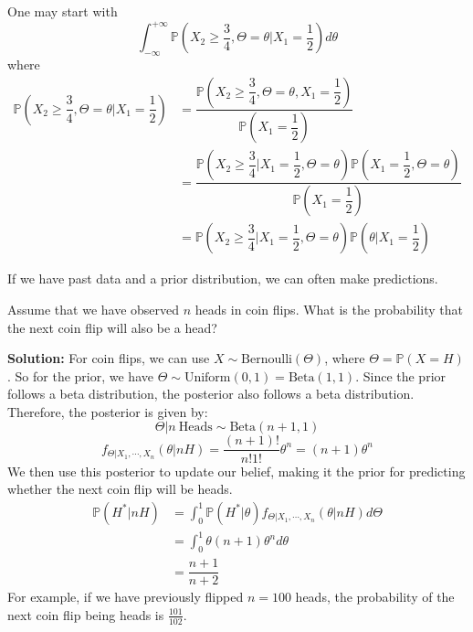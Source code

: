\begin{remark}
  One may start with 
  \[
    \int_{-\infty}^{+\infty} \mathbb{P}\left(X_2 \geq \dfrac{3}{4}, \Theta = \theta \vert X_1 = \dfrac{1}{2}\right) d \theta
  \]
  where 
  \[
    \begin{aligned}
      \mathbb{P}\left(X_2 \geq \dfrac{3}{4}, \Theta = \theta \vert X_1 = \dfrac{1}{2}\right) &= \dfrac{\mathbb{P}\left(X_2 \geq \dfrac{3}{4}, \Theta = \theta, X_1 = \dfrac{1}{2}\right)}{\mathbb{P}\left(X_1 = \dfrac{1}{2}\right)} \\
      &= \dfrac{\mathbb{P}\left(X_2 \geq \dfrac{3}{4} \vert X_1 = \dfrac{1}{2}, \Theta = \theta\right)\mathbb{P}\left(X_1 = \dfrac{1}{2}, \Theta = \theta\right)}{\mathbb{P}\left(X_1 = \dfrac{1}{2}\right)} \\
      &= \mathbb{P}\left(X_2 \geq \dfrac{3}{4} \vert X_1 = \dfrac{1}{2}, \Theta = \theta\right) \mathbb{P} \left(\theta \vert X_1 = \dfrac{1}{2}\right)
    \end{aligned}
  \]
\end{remark}

If we have past data and a prior distribution, we can often make predictions.
\begin{eg}
  Assume that we have observed \(n\) heads in coin flips. What is the probability that the next coin flip will also be a head? 
  
  \textbf{Solution:}
  For coin flips, we can use \(X \sim \text{Bernoulli}(\Theta)\), where \(\Theta = \mathbb{P}(X = H)\). So for the prior, we have \(\Theta \sim \text{Uniform}(0, 1) = \text{Beta}(1,1)\). Since the prior follows a beta distribution, the posterior also follows a beta distribution. Therefore, the posterior is given by:
  \[
    \Theta \vert n\ \text{Heads} \sim \text{Beta}(n + 1, 1)
  \]
  \[
    f_{\Theta \vert X_1, \cdots, X_n} (\theta \vert nH) = \dfrac{(n + 1)!}{n!1!}\theta^n = (n + 1)\theta^n
  \]
  We then use this posterior to update our belief, making it the prior for predicting whether the next coin flip will be heads.
  \[
  \begin{aligned}
    \mathbb{P} (H^* \vert nH) &= \int_0^1 \mathbb{P} (H^* \vert \theta) f_{\Theta \vert X_1, \cdots, X_n} (\theta \vert nH) d \Theta \\
    &= \int_0^1 \theta (n + 1)\theta^n d \theta \\\
    &= \dfrac{n + 1}{n + 2}
  \end{aligned}
  \]
  For example, if we have previously flipped \(n = 100\) heads, the probability of the next coin flip being heads is \(\frac{101}{102}\). 
\end{eg}

